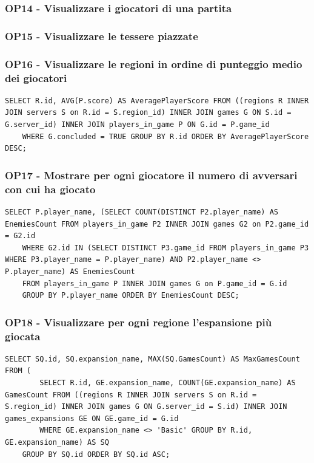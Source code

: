 \subsubsection*{OP14 - Visualizzare i giocatori di una partita}

\subsubsection*{OP15 - Visualizzare le tessere piazzate}

\subsubsection*{OP16 - Visualizzare le regioni in ordine di punteggio medio dei giocatori}
\begin{lstlisting}[style=sql]
    SELECT R.id, AVG(P.score) AS AveragePlayerScore FROM ((regions R INNER JOIN servers S on R.id = S.region_id) INNER JOIN games G ON S.id = G.server_id) INNER JOIN players_in_game P ON G.id = P.game_id
    WHERE G.concluded = TRUE GROUP BY R.id ORDER BY AveragePlayerScore DESC;
\end{lstlisting}

\subsubsection*{OP17 - Mostrare per ogni giocatore il numero di avversari con cui ha giocato}
\begin{lstlisting}[style=sql]
    SELECT P.player_name, (SELECT COUNT(DISTINCT P2.player_name) AS EnemiesCount FROM players_in_game P2 INNER JOIN games G2 on P2.game_id = G2.id
    WHERE G2.id IN (SELECT DISTINCT P3.game_id FROM players_in_game P3 WHERE P3.player_name = P.player_name) AND P2.player_name <> P.player_name) AS EnemiesCount
    FROM players_in_game P INNER JOIN games G on P.game_id = G.id
    GROUP BY P.player_name ORDER BY EnemiesCount DESC;
\end{lstlisting}

\subsubsection*{OP18 - Visualizzare per ogni regione l'espansione più giocata}
\begin{lstlisting}[style=sql]
    SELECT SQ.id, SQ.expansion_name, MAX(SQ.GamesCount) AS MaxGamesCount FROM (
        SELECT R.id, GE.expansion_name, COUNT(GE.expansion_name) AS GamesCount FROM ((regions R INNER JOIN servers S on R.id = S.region_id) INNER JOIN games G ON G.server_id = S.id) INNER JOIN games_expansions GE ON GE.game_id = G.id
        WHERE GE.expansion_name <> 'Basic' GROUP BY R.id, GE.expansion_name) AS SQ
    GROUP BY SQ.id ORDER BY SQ.id ASC;
\end{lstlisting}

